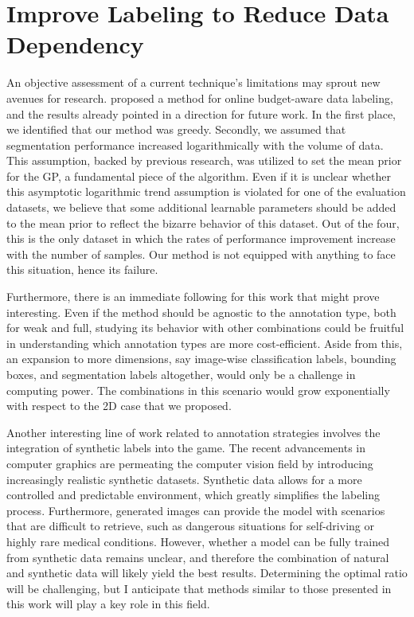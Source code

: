 
\section{Improve Labeling to Reduce Data Dependency}
An objective assessment of a current technique's limitations may sprout new avenues for research.  proposed a method for online budget-aware data labeling, and the results already pointed in a direction for future work. In the first place, we identified that our method was greedy. Secondly, we assumed that segmentation performance increased logarithmically with the volume of data. This assumption, backed by previous research, was utilized to set the mean prior for the GP, a fundamental piece of the algorithm. Even if it is unclear whether this asymptotic logarithmic trend assumption is violated for one of the evaluation datasets, we believe that some additional learnable parameters should be added to the mean prior to reflect the bizarre behavior of this dataset. Out of the four, this is the only dataset in which the rates of performance improvement increase with the number of samples. Our method is not equipped with anything to face this situation, hence its failure.

Furthermore, there is an immediate following for this work that might prove interesting. Even if the method should be agnostic to the annotation type, both for weak and full, studying its behavior with other combinations could be fruitful in understanding which annotation types are more cost-efficient. Aside from this, an expansion to more dimensions, say image-wise classification labels, bounding boxes, and segmentation labels altogether, would only be a challenge in computing power. The combinations in this scenario would grow exponentially with respect to the 2D case that we proposed.

Another interesting line of work related to annotation strategies involves the integration of synthetic labels into the game. The recent advancements in computer graphics are permeating the computer vision field by introducing increasingly realistic synthetic datasets. Synthetic data allows for a more controlled and predictable environment, which greatly simplifies the labeling process. Furthermore, generated images can provide the model with scenarios that are difficult to retrieve, such as dangerous situations for self-driving or highly rare medical conditions. However, whether a model can be fully trained from synthetic data remains unclear, and therefore the combination of natural and synthetic data will likely yield the best results. Determining the optimal ratio will be challenging, but I anticipate that methods similar to those presented in this work will play a key role in this field. 

